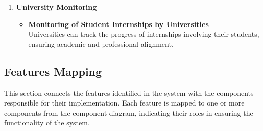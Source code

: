 \begin{enumerate}
    \item \textbf{University Monitoring}
    \begin{itemize}
        \item \textbf{Monitoring of Student Internships by Universities}
        \\Universities can track the progress of internships involving their students, ensuring academic and professional alignment.
    \end{itemize}
\end{enumerate}

\subsection{Features Mapping}
This section connects the features identified in the system with the components responsible for their implementation. Each feature is mapped to one or more components from the component diagram, indicating their roles in ensuring the functionality of the system.

